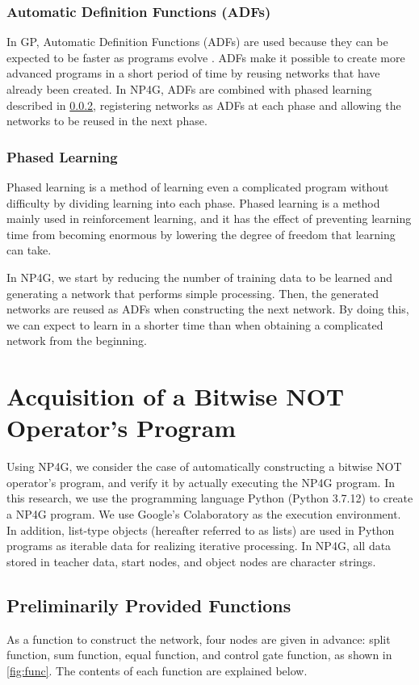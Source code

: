 \documentclass{article}
\begin{document}
\subsubsection {Automatic Definition Functions (ADFs)}
In GP, Automatic Definition Functions (ADFs) are used because they can be expected to be faster as programs evolve \cite{adfs}.
ADFs make it possible to create more advanced programs in a short period of time by reusing networks that have already been created.
In NP4G, ADFs are combined with phased learning described in \ref{sec:PL}, registering networks as ADFs at each phase and allowing the networks to be reused in the next phase.

\subsubsection {Phased Learning}
\label{sec:PL}
Phased learning is a method of learning even a complicated program without difficulty by dividing learning into each phase.
Phased learning is a method mainly used in reinforcement learning, and it has the effect of preventing learning time from becoming enormous by lowering the degree of freedom that learning can take.

In NP4G, we start by reducing the number of training data to be learned and generating a network that performs simple processing.
Then, the generated networks are reused as ADFs when constructing the next network.
By doing this, we can expect to learn in a shorter time than when obtaining a complicated network from the beginning.

\section {Acquisition of a Bitwise NOT Operator's Program}
Using NP4G, we consider the case of automatically constructing a bitwise NOT operator's program, and verify it by actually executing the NP4G program.
In this research, we use the programming language Python (Python 3.7.12) to create a NP4G program.
We use Google's Colaboratory as the execution environment.
In addition, list-type objects (hereafter referred to as lists) are used in Python programs as iterable data for realizing iterative processing.
In NP4G, all data stored in teacher data, start nodes, and object nodes are character strings.

\subsection {Preliminarily Provided Functions}
As a function to construct the network, four nodes are given in advance: split function, sum function, equal function, and control gate function, as shown in \ref{fig:func}.
The contents of each function are explained below.
\end{document}
